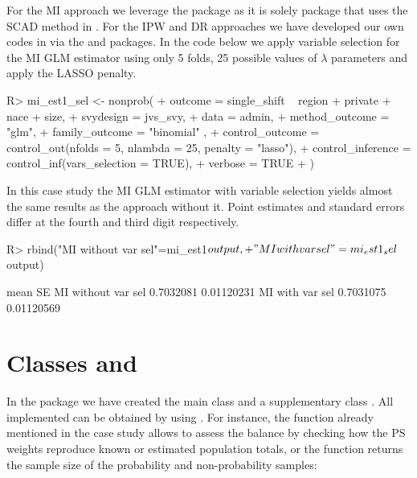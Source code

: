 \documentclass[
]{jss}
\begin{document}
For the MI approach we leverage the  package \citep{ncvreg}
as it is solely package that uses the SCAD method in . For
the IPW and DR approaches we have developed our own codes in
 via the  and  packages. In
the code below we apply variable selection for the MI GLM estimator
using only 5 folds, 25 possible values of \(\lambda\) parameters and
apply the LASSO penalty.

\begin{CodeChunk}
\begin{CodeInput}
R> mi_est1_sel <- nonprob(
+   outcome = single_shift ~ region + private + nace + size,
+   svydesign = jvs_svy,
+   data = admin,
+   method_outcome = "glm",
+   family_outcome = "binomial" ,
+   control_outcome = control_out(nfolds = 5, nlambda = 25, penalty = "lasso"),
+   control_inference = control_inf(vars_selection = TRUE),
+   verbose = TRUE
+ )
\end{CodeInput}
\end{CodeChunk}

In this case study the MI GLM estimator with variable selection yields
almost the same results as the approach without it. Point estimates and
standard errors differ at the fourth and third digit respectively.

\begin{CodeChunk}
\begin{CodeInput}
R> rbind("MI without var sel"=mi_est1$output,
+       "MI with var sel"=mi_est1_sel$output)
\end{CodeInput}
\begin{CodeOutput}
                        mean         SE
MI without var sel 0.7032081 0.01120231
MI with var sel    0.7031075 0.01120569
\end{CodeOutput}
\end{CodeChunk}

\section[Classes and S3Methods]{Classes and }\label{sec-s3methods}

In the package we have created the main class  and a
supplementary class . All 
implemented can be obtained by using .
For instance, the  function already mentioned in the
case study allows to assess the balance by checking how the PS weights
reproduce known or estimated population totals, or the 
function returns the sample size of the probability and non-probability
samples:
\end{document}
